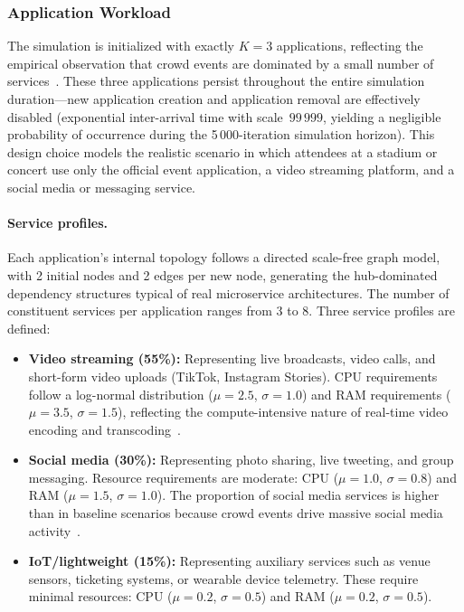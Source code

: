 \subsubsection{Application Workload}

The simulation is initialized with exactly $K = 3$ applications, reflecting the empirical observation that crowd events are dominated by a small number of services~\cite{Pujol2015Understanding}. These three applications persist throughout the entire simulation duration---new application creation and application removal are effectively disabled (exponential inter-arrival time with scale~$99\,999$, yielding a negligible probability of occurrence during the 5\,000-iteration simulation horizon). This design choice models the realistic scenario in which attendees at a stadium or concert use only the official event application, a video streaming platform, and a social media or messaging service.

\paragraph{Service profiles.} Each application's internal topology follows a directed scale-free graph model, with 2 initial nodes and 2 edges per new node, generating the hub-dominated dependency structures typical of real microservice architectures. The number of constituent services per application ranges from 3 to 8. Three service profiles are defined:

\begin{itemize}
    \item \textbf{Video streaming (55\%):} Representing live broadcasts, video calls, and short-form video uploads (TikTok, Instagram Stories). CPU requirements follow a log-normal distribution ($\mu = 2.5$, $\sigma = 1.0$) and RAM requirements ($\mu = 3.5$, $\sigma = 1.5$), reflecting the compute-intensive nature of real-time video encoding and transcoding~\cite{CiscoAIR2023}.
    
    \item \textbf{Social media (30\%):} Representing photo sharing, live tweeting, and group messaging. Resource requirements are moderate: CPU ($\mu = 1.0$, $\sigma = 0.8$) and RAM ($\mu = 1.5$, $\sigma = 1.0$). The proportion of social media services is higher than in baseline scenarios because crowd events drive massive social media activity~\cite{Benevenuto2009Characterizing}.
    
    \item \textbf{IoT/lightweight (15\%):} Representing auxiliary services such as venue sensors, ticketing systems, or wearable device telemetry. These require minimal resources: CPU ($\mu = 0.2$, $\sigma = 0.5$) and RAM ($\mu = 0.2$, $\sigma = 0.5$).
\end{itemize}

